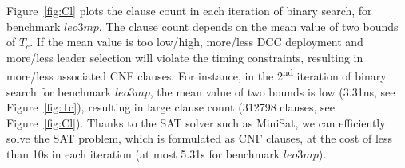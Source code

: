 Figure~\ref{fig:Cl} plots the clause count in each iteration of binary search, for benchmark $leo3mp$. The clause count depends on the mean value of two bounds of $T_{c}$. If the mean value is too low/high, more/less DCC deployment and more/less leader selection will violate the timing constraints, resulting in more/less associated CNF clauses. For instance, in the 2\textsuperscript{nd} iteration of binary search for benchmark $leo3mp$, the mean value of two bounds is low (3.31ns, see Figure~\ref{fig:Tc}), resulting in large clause count (312798 clauses, see Figure~\ref{fig:Cl}). Thanks to the SAT solver such as MiniSat, we can efficiently solve the SAT problem, which is formulated as CNF clauses, at the cost of less than 10s in each iteration (at most 5.31s for benchmark $leo3mp$).








